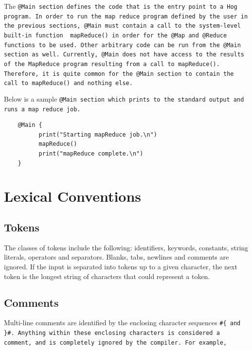 \documentclass{article}
\begin{document}
The \tt @Main \rm section defines the code that is the entry point to a Hog program. In order to run the map reduce program
defined by the user in the previous sections, \tt @Main \rm must contain a call to the system-level built-in function \tt
mapReduce() \rm in order for the \tt @Map \rm and \tt @Reduce \rm functions to be used. Other arbitrary code can be run from
the \tt @Main \rm section as well. Currently, \tt @Main \rm does not have access to the results of the MapReduce program
resulting from a call to \tt mapReduce()\rm. Therefore, it is quite common for the \tt @Main \rm section to contain the call to
\tt mapReduce() \rm and nothing else.

Below is a sample \tt @Main \rm section which prints to the standard output and runs a map reduce job.

\begin{verbatim}
    @Main {
          print("Starting mapReduce job.\n")
          mapReduce()
          print("mapReduce complete.\n")
    }
\end{verbatim}




\section{Lexical Conventions} %
\label{sec:lexical_conventions}

\subsection{Tokens} %
\label{sub:tokens}

The classes of tokens include the following: identifiers, keywords,
constants, string literals, operators and separators. Blanks, tabs, newlines and
comments are ignored. If the input is separated into tokens up to a given
character, the next token is the longest string of characters that could represent
a token.


\subsection{Comments} %
\label{sub:comments}

Multi-line comments are identified by the enclosing character sequences \tt \#\{ \rm and \tt \}\#\rm. Anything within these
enclosing characters is considered a comment, and is completely ignored by the compiler. For example,
\end{document}
